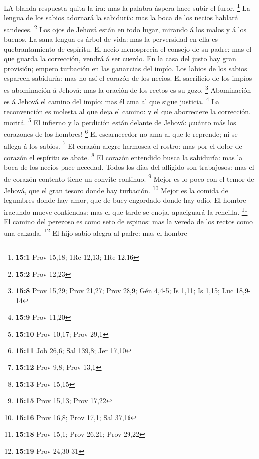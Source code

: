  LA blanda respuesta quita la ira: mas la palabra áspera
hace subir el furor. \footnote{\textbf{15:1} Prov 15,18; 1Re 12,13; 1Re
  12,16}  La lengua de los sabios adornará la sabiduría: mas
la boca de los necios hablará sandeces. \footnote{\textbf{15:2} Prov
  12,23}  Los ojos de Jehová están en todo lugar, mirando á
los malos y á los buenos.  La sana lengua es árbol de vida:
mas la perversidad en ella es quebrantamiento de espíritu. 
El necio menosprecia el consejo de su padre: mas el que guarda la
corrección, vendrá á ser cuerdo.  En la casa del justo hay
gran provisión; empero turbación en las ganancias del impío.
 Los labios de los sabios esparcen sabiduría: mas no así el
corazón de los necios.  El sacrificio de los impíos es
abominación á Jehová: mas la oración de los rectos es su gozo.
\footnote{\textbf{15:8} Prov 15,29; Prov 21,27; Prov 28,9; Gén 4,4-5; Is
  1,11; Is 1,15; Luc 18,9-14}  Abominación es á Jehová el
camino del impío: mas él ama al que sigue justicia. \footnote{\textbf{15:9}
  Prov 11,20}  La reconvención es molesta al que deja el
camino: y el que aborreciere la corrección, morirá. \footnote{\textbf{15:10}
  Prov 10,17; Prov 29,1}  El infierno y la perdición están
delante de Jehová: ¡cuánto más los corazones de los hombres! \footnote{\textbf{15:11}
  Job 26,6; Sal 139,8; Jer 17,10}  El escarnecedor no ama
al que le reprende; ni se allega á los sabios. \footnote{\textbf{15:12}
  Prov 9,8; Prov 13,1}  El corazón alegre hermosea el
rostro: mas por el dolor de corazón el espíritu se abate. \footnote{\textbf{15:13}
  Prov 15,15}  El corazón entendido busca la sabiduría: mas
la boca de los necios pace necedad.  Todos los días del
afligido son trabajosos: mas el de corazón contento tiene un convite
continuo. \footnote{\textbf{15:15} Prov 15,13; Prov 17,22} 
Mejor es lo poco con el temor de Jehová, que el gran tesoro donde hay
turbación. \footnote{\textbf{15:16} Prov 16,8; Prov 17,1; Sal 37,16}
 Mejor es la comida de legumbres donde hay amor, que de
buey engordado donde hay odio.  El hombre iracundo mueve
contiendas: mas el que tarde se enoja, apaciguará la rencilla.
\footnote{\textbf{15:18} Prov 15,1; Prov 26,21; Prov 29,22}
 El camino del perezoso es como seto de espinos: mas la
vereda de los rectos como una calzada. \footnote{\textbf{15:19} Prov
  24,30-31}  El hijo sabio alegra al padre: mas el hombre

